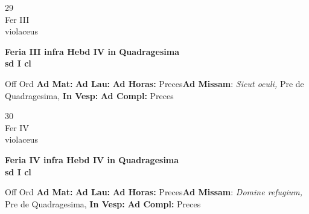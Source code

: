 \documentclass[10pt, openany]{book}
\begin{document}
        \begin{center}
            \begin{minipage}{3.5in}
                \vspace{2em}
                \begin{minipage}{0.5in}
                    {\Huge 29} \\
                    {\normalsize Fer III} \\
                    {\normalsize violaceus}
                \end{minipage}
                \begin{minipage}{3.0in}
                    \textbf{ \large Feria III infra Hebd IV in Quadragesima  \\
                    \textnormal{\normalsize sd I cl}} \\ 
                \end{minipage}
                \begin{justify}Off Ord
                    \textbf{Ad Mat: }
                    \textbf{Ad Lau: }
                    \textbf{Ad Horas: }Preces\textbf{Ad Missam}: \textit{Sicut oculi,} Pre de Quadragesima,  
                    \textbf{In Vesp: }
                    \textbf{Ad Compl: }Preces
                \end{justify}
            \end{minipage}
        \end{center}
    
        \begin{center}
            \begin{minipage}{3.5in}
                \vspace{2em}
                \begin{minipage}{0.5in}
                    {\Huge 30} \\
                    {\normalsize Fer IV} \\
                    {\normalsize violaceus}
                \end{minipage}
                \begin{minipage}{3.0in}
                    \textbf{ \large Feria IV infra Hebd IV in Quadragesima  \\
                    \textnormal{\normalsize sd I cl}} \\ 
                \end{minipage}
                \begin{justify}Off Ord
                    \textbf{Ad Mat: }
                    \textbf{Ad Lau: }
                    \textbf{Ad Horas: }Preces\textbf{Ad Missam}: \textit{Domine refugium,} Pre de Quadragesima,  
                    \textbf{In Vesp: }
                    \textbf{Ad Compl: }Preces
                \end{justify}
            \end{minipage}
        \end{center}
    
\end{document}
